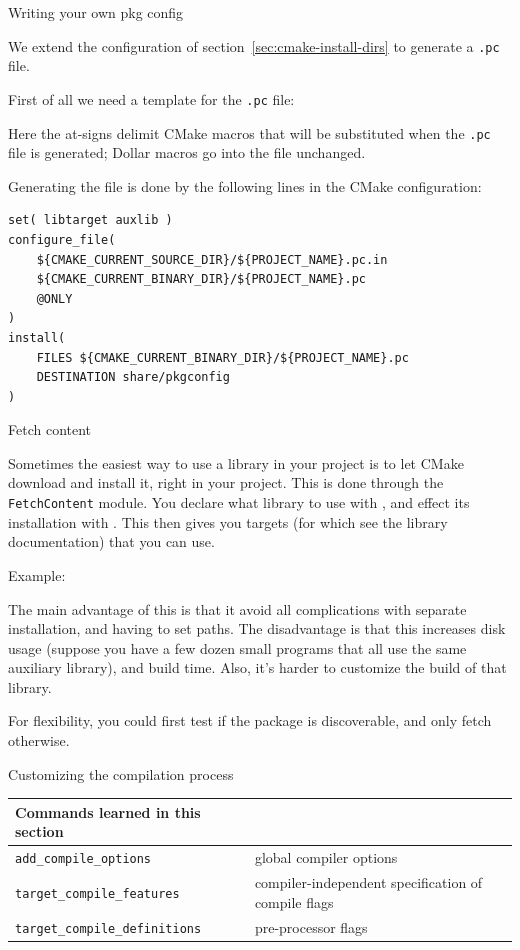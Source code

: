  {Writing your own pkg config}

We extend the configuration of section~\ref{sec:cmake-install-dirs}
to generate a \lstinline[language=shell]{.pc} file.

First of all we need a template for the \lstinline[language=shell]{.pc} file:
%

%
Here the at-signs delimit CMake macros that will be substituted
when the \lstinline[language=shell]{.pc} file is generated;
Dollar macros go into the file unchanged.

Generating the file is done by the following lines in the CMake configuration:
%
\begin{lstlisting}
set( libtarget auxlib )
configure_file(
    ${CMAKE_CURRENT_SOURCE_DIR}/${PROJECT_NAME}.pc.in
    ${CMAKE_CURRENT_BINARY_DIR}/${PROJECT_NAME}.pc
    @ONLY
)  
install(
    FILES ${CMAKE_CURRENT_BINARY_DIR}/${PROJECT_NAME}.pc
    DESTINATION share/pkgconfig
)
\end{lstlisting}

 {Fetch content}

Sometimes the easiest way to use a library in your project is to
let CMake download and install it, right in your project.
This is done through the \lstinline{FetchContent} module.
You declare what library to use with ,
and effect its installation with .
This then gives you targets (for which see the library documentation)
that you can use.

Example:


The main advantage of this is that it avoid all complications
with separate installation, and having to set paths.
The disadvantage is that this increases disk usage
(suppose you have a few dozen small programs that all use
the same auxiliary library),
and build time. Also, it's harder to customize the build
of that library.

For flexibility, you could first test if the package is discoverable,
and only fetch otherwise.
%



 {Customizing the compilation process}

\begin{tabular}{lp{3in}}
  \toprule
  Commands learned in this section\\
  \midrule
  \lstinline+add_compile_options+&global compiler options\\
  \lstinline+target_compile_features+&compiler-independent specification of compile flags\\
  \lstinline+target_compile_definitions+&pre-processor flags\\
  \bottomrule
\end{tabular}

